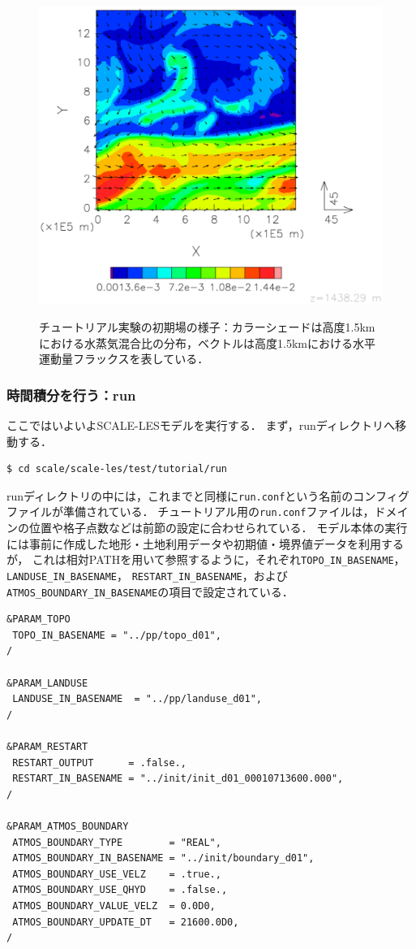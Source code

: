 \begin{figure}[t]
\begin{center}
  \includegraphics[width=0.7\hsize]{./figure/init_qv-momxy.eps}\\
  \caption{チュートリアル実験の初期場の様子：カラーシェードは高度1.5kmにおける水蒸気混合比の分布，ベクトルは高度1.5kmにおける水平運動量フラックスを表している．}
  \label{fig:init}
\end{center}
\end{figure}


\subsubsection{時間積分を行う：run}

ここではいよいよSCALE-LESモデルを実行する．
まず，runディレクトリへ移動する．\\
\begin{verbatim}
$ cd scale/scale-les/test/tutorial/run
\end{verbatim}

runディレクトリの中には，これまでと同様に\verb|run.conf|という名前のコンフィグファイルが準備されている．
チュートリアル用の\verb|run.conf|ファイルは，ドメインの位置や格子点数などは前節の設定に合わせられている．
モデル本体の実行には事前に作成した地形・土地利用データや初期値・境界値データを利用するが，
これは相対PATHを用いて参照するように，それぞれ\verb|TOPO_IN_BASENAME|，\verb|LANDUSE_IN_BASENAME|，
\verb|RESTART_IN_BASENAME|，および\verb|ATMOS_BOUNDARY_IN_BASENAME|の項目で設定されている．

\begin{verbatim}
&PARAM_TOPO
 TOPO_IN_BASENAME = "../pp/topo_d01",
/

&PARAM_LANDUSE
 LANDUSE_IN_BASENAME  = "../pp/landuse_d01",
/

&PARAM_RESTART
 RESTART_OUTPUT      = .false.,
 RESTART_IN_BASENAME = "../init/init_d01_00010713600.000",
/

&PARAM_ATMOS_BOUNDARY
 ATMOS_BOUNDARY_TYPE        = "REAL",
 ATMOS_BOUNDARY_IN_BASENAME = "../init/boundary_d01",
 ATMOS_BOUNDARY_USE_VELZ    = .true.,
 ATMOS_BOUNDARY_USE_QHYD    = .false.,
 ATMOS_BOUNDARY_VALUE_VELZ  = 0.0D0,
 ATMOS_BOUNDARY_UPDATE_DT   = 21600.0D0,
/

\end{verbatim}


